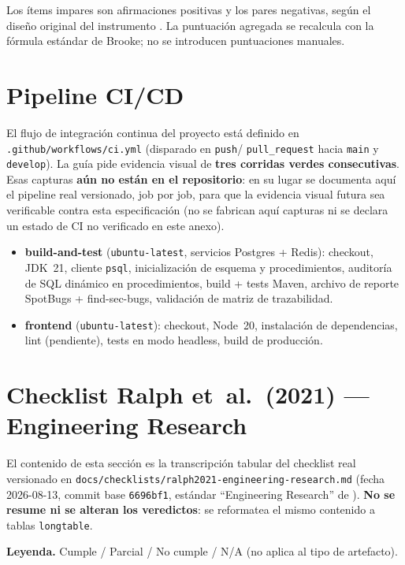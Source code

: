 Los ítems impares son afirmaciones positivas y los pares negativas, según
el diseño original del instrumento \citep{brooke1996sus}. La puntuación
agregada se recalcula con la fórmula estándar de Brooke; no se introducen
puntuaciones manuales.

\section{Pipeline CI/CD}

El flujo de integración continua del proyecto está definido en
\texttt{.github/workflows/ci.yml} (disparado en \texttt{push}/
\texttt{pull\_request} hacia \texttt{main} y \texttt{develop}). La guía
pide evidencia visual de \textbf{tres corridas verdes consecutivas}.
Esas capturas \textbf{aún no están en el repositorio}: en su lugar se
documenta aquí el pipeline real versionado, job por job, para que la
evidencia visual futura sea verificable contra esta especificación
(no se fabrican aquí capturas ni se declara un estado de CI no
verificado en este anexo).

\begin{itemize}[leftmargin=1.4cm]
  \item \textbf{build-and-test} (\texttt{ubuntu-latest}, servicios
    Postgres + Redis): checkout, JDK~21, cliente \texttt{psql},
    inicialización de esquema y procedimientos, auditoría de SQL
    dinámico en procedimientos, build + tests Maven, archivo de
    reporte SpotBugs + find-sec-bugs, validación de matriz de
    trazabilidad.
  \item \textbf{frontend} (\texttt{ubuntu-latest}): checkout, Node~20,
    instalación de dependencias, lint (pendiente), tests en modo
    headless, build de producción.
\end{itemize}

\section{Checklist Ralph et~al.\ (2021) --- Engineering Research}

El contenido de esta sección es la transcripción tabular del checklist
real versionado en
\texttt{docs/checklists/ralph2021-engineering-research.md}
(fecha 2026-08-13, commit base \texttt{6696bf1}, estándar
``Engineering Research'' de \citet{ralph2021empiricalstandards}).
\textbf{No se resume ni se alteran los veredictos}: se reformatea el
mismo contenido a tablas \texttt{longtable}.

\textbf{Leyenda.} Cumple / Parcial / No cumple / N/A (no aplica al tipo
de artefacto).

